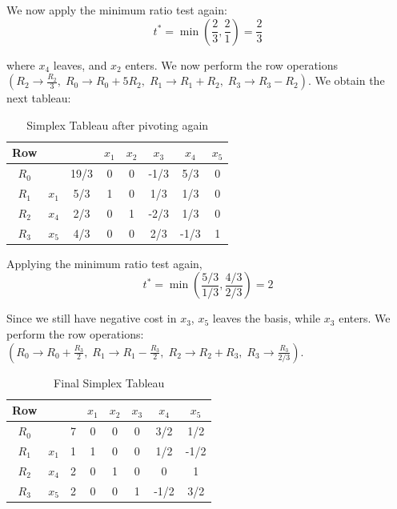 \documentclass{article}
\begin{document}
\noindent We now apply the minimum ratio test again: \begin{equation*}
    t^{*} = \min \left(\frac{2}{3}, \frac{2}{1}\right) = \frac{2}{3}
\end{equation*}

\noindent where $x_{4}$ leaves, and $x_{2}$ enters. We now perform the row operations $(R_{2} \to \frac{R_{2}}{3}, \; R_{0} \to  R_{0} + 5 R_{2}, \; R_{1} \to  R_{1} + R_{2}, \; R_{3} \to R_{3}-R_{2})$. We obtain the next tableau:


\begin{table}[H]
    \centering
    \begin{tabular}{c | c c | c c c c c}
        Row & & & $x_{1}$ & $x_{2}$ & $x_{3}$ & $x_{4}$ & $x_{5}$ \\ \hline 
        $R_{0}$ & & 19/3 & 0 & 0 & -1/3 & 5/3 & 0 \\ \hline 
        $R_{1}$ & $x_{1}$ & 5/3  & 1 & 0 & 1/3 & 1/3 & 0 \\ 
        $R_{2}$ & $x_{4}$ & 2/3 & 0 & 1 & -2/3 & 1/3 & 0 \\ 
        $R_{3}$ & $x_{5}$ & 4/3 & 0 & 0 & 2/3 & -1/3 & 1
    \end{tabular}
    \caption{Simplex Tableau after pivoting again}
    \label{tab: 2-tableaupivoted3}
\end{table} 

\noindent Applying the minimum ratio test again, \begin{equation*}
    t^{*} = \min \left( \frac{5/3}{1/3}, \frac{4/3}{2/3}\right) = 2
\end{equation*}

\noindent Since we still have negative cost in $x_{3}$, $x_{5}$ leaves the basis, while $x_{3}$ enters. We perform the row operations: $(R_{0} \to R_{0} + \frac{R_{3}}{2}, \; R_{1} \to R_{1}-\frac{R_{3}}{2}, \; R_{2} \to R_{2}+R_{3}, \; R_{3} \to \frac{R_{3}}{2/3})$.


\begin{table}[H]
    \centering
    \begin{tabular}{c | c c | c c c c c}
        Row & & & $x_{1}$ & $x_{2}$ & $x_{3}$ & $x_{4}$ & $x_{5}$ \\ \hline 
        $R_{0}$ & & 7 & 0 & 0 & 0 & 3/2 & 1/2 \\ \hline 
        $R_{1}$ & $x_{1}$ & 1  & 1 & 0 & 0 & 1/2 & -1/2 \\ 
        $R_{2}$ & $x_{4}$ & 2 & 0 & 1 & 0 & 0 & 1 \\ 
        $R_{3}$ & $x_{5}$ & 2 & 0 & 0 & 1 & -1/2 & 3/2 
    \end{tabular}
    \caption{Final Simplex Tableau }
    \label{tab: 2-finaltableau}
\end{table} 
\end{document}
